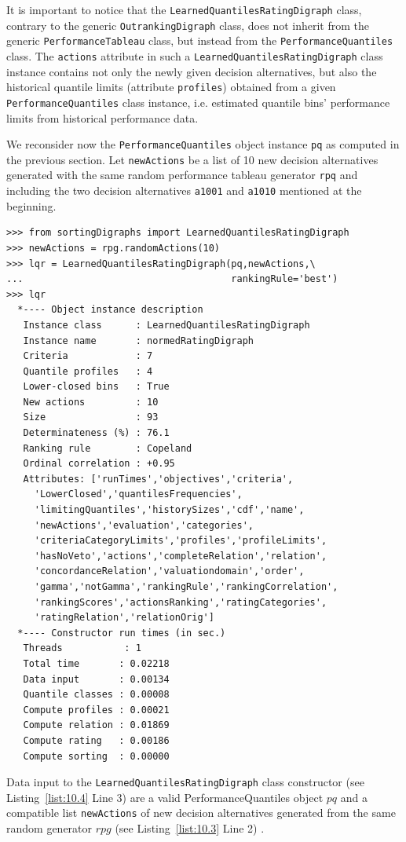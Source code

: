 It is important to notice that the \texttt{LearnedQuantilesRatingDigraph} class, contrary to the generic \texttt{OutrankingDigraph} class, does not inherit from the generic \texttt{PerformanceTableau} class, but instead from the \texttt{PerformanceQuantiles} class. The \texttt{actions} attribute in such a \texttt{LearnedQuantilesRatingDigraph} class instance contains not only the newly given decision alternatives, but also the historical quantile limits (attribute \texttt{profiles}) obtained from a given \texttt{PerformanceQuantiles} class instance, i.e. estimated quantile bins' performance limits from historical performance data.

We reconsider now the \texttt{PerformanceQuantiles} object instance \texttt{pq} as computed in the previous section. Let \texttt{newActions} be a list of 10 new decision alternatives generated with the same random performance tableau generator \texttt{rpq} and including the two decision alternatives \texttt{a1001} and \texttt{a1010} mentioned at the beginning.
\begin{lstlisting}[caption={Computing the absolute rating of 10 new decision alternatives},label=list:10.4]
>>> from sortingDigraphs import LearnedQuantilesRatingDigraph
>>> newActions = rpg.randomActions(10)
>>> lqr = LearnedQuantilesRatingDigraph(pq,newActions,\
...                                     rankingRule='best')
>>> lqr
  *---- Object instance description
   Instance class      : LearnedQuantilesRatingDigraph
   Instance name       : normedRatingDigraph
   Criteria            : 7
   Quantile profiles   : 4
   Lower-closed bins   : True
   New actions         : 10
   Size                : 93
   Determinateness (%) : 76.1
   Ranking rule        : Copeland
   Ordinal correlation : +0.95
   Attributes: ['runTimes','objectives','criteria',
     'LowerClosed','quantilesFrequencies',
     'limitingQuantiles','historySizes','cdf','name',
     'newActions','evaluation','categories',
     'criteriaCategoryLimits','profiles','profileLimits',
     'hasNoVeto','actions','completeRelation','relation',
     'concordanceRelation','valuationdomain','order',
     'gamma','notGamma','rankingRule','rankingCorrelation',
     'rankingScores','actionsRanking','ratingCategories',
     'ratingRelation','relationOrig']
  *---- Constructor run times (in sec.)
   Threads           : 1
   Total time       : 0.02218
   Data input       : 0.00134
   Quantile classes : 0.00008
   Compute profiles : 0.00021
   Compute relation : 0.01869
   Compute rating   : 0.00186
   Compute sorting  : 0.00000
\end{lstlisting}
Data input to the \texttt{LearnedQuantilesRatingDigraph} class constructor (see Listing~\ref{list:10.4} Line 3) are a valid PerformanceQuantiles object $pq$ and a compatible list \texttt{newActions} of new decision alternatives generated from the same random generator $rpg$ (see Listing~\ref{list:10.3} Line 2) .

